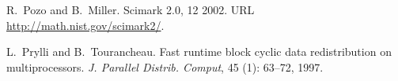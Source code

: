 \documentclass{sigplanconf}
\begin{document}
\begin{thebibliography}{18}
R.~Pozo and B.~Miller.
\newblock Scimark 2.0, 12 2002.
\newblock URL \url{http://math.nist.gov/scimark2/}.

L.~Prylli and B.~Tourancheau.
\newblock Fast runtime block cyclic data redistribution on multiprocessors.
\newblock \emph{J. Parallel Distrib. Comput}, 45 (1): 63--72,
  1997.

\end{thebibliography}
\end{document}
